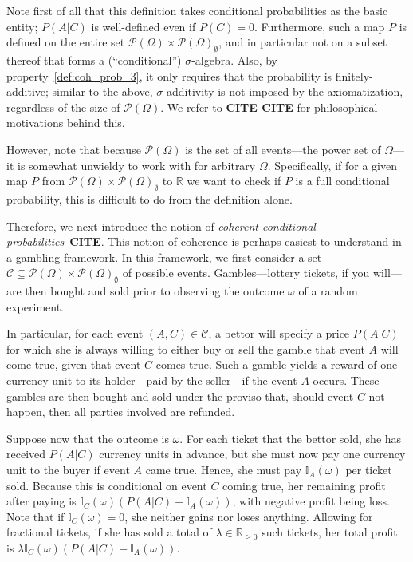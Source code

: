 \documentclass[10pt,a4paper]{paper}
\theoremstyle{definition}
\newcommand{\reals}{\mathbb{R}}
\newcommand{\realsnonneg}{\reals_{\geq 0}}
\newcommand{\paths}{\Omega}
\newcommand{\power}{\mathcal{P}(\paths)}
\newcommand{\nonemptypower}{\power_{\emptyset}}
\newcommand{\ind}[1]{\mathbb{I}_{#1}}
\begin{document}
Note first of all that this definition takes conditional probabilities as the basic entity; $P(A\vert C)$ is well-defined even if $P(C)=0$. Furthermore, such a map $P$ is defined on the entire set $\power\times\nonemptypower$, and in particular not on a subset thereof that forms a (``conditional'') $\sigma$-algebra. Also, by property~\ref{def:coh_prob_3}, it only requires that the probability is finitely-additive; similar to the above, $\sigma$-additivity is not imposed by the axiomatization, regardless of the size of $\power$.  We refer to {\bf CITE CITE} for philosophical motivations behind this.

However, note that because $\power$ is the set of all events---the power set of $\Omega$---it is somewhat unwieldy to work with for arbitrary $\Omega$. Specifically, if for a given map $P$ from $\power\times\nonemptypower$ to $\reals$ we want to check if $P$ is a full conditional probability, this is difficult to do from the definition alone.

Therefore, we next introduce the notion of \emph{coherent conditional probabilities}~{\bf CITE}. %
This notion of coherence is perhaps easiest to understand in a gambling framework. In this framework, we first consider a set $\mathcal{C}\subseteq\power\times\nonemptypower$ of possible events. Gambles---lottery tickets, if you will---are then bought and sold prior to observing the outcome $\omega$ of a random experiment. 

In particular, for each event $(A,C)\in\mathcal{C}$, a bettor will specify a price $P(A\vert C)$ for which she is always willing to either buy or sell the gamble that event $A$ will come true, given that event $C$ comes true. Such a gamble yields a reward of one currency unit to its holder---paid by the seller---if the event $A$ occurs. These gambles are then bought and sold under the proviso that, should event $C$ not happen, then all parties involved are refunded. 

Suppose now that the outcome is $\omega$. For each ticket that the bettor sold, she has received $P(A\vert C)$ currency units in advance, but she must now pay one currency unit to the buyer if event $A$ came true. Hence, she must pay $\ind{A}(\omega)$ per ticket sold. Because this is conditional on event $C$ coming true, her remaining profit after paying is $\ind{C}(\omega)(P(A\vert C) - \ind{A}(\omega))$, with negative profit being loss. Note that if $\ind{C}(\omega)=0$, she neither gains nor loses anything. Allowing for fractional tickets, if she has sold a total of $\lambda\in\realsnonneg$ such tickets, her total profit is $\lambda \ind{C}(\omega)(P(A\vert C) - \ind{A}(\omega))$.
\end{document}
